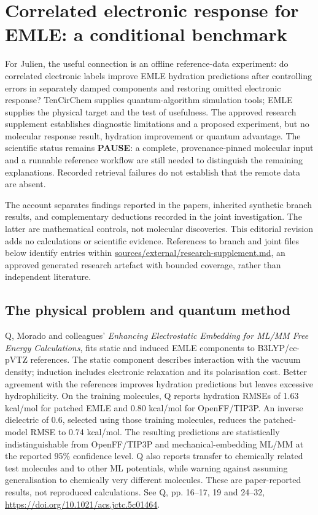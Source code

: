 \documentclass{article}
\date{}
\begin{document}
\section{Correlated electronic response for EMLE: a conditional benchmark}

For Julien, the useful connection is an offline reference-data experiment: do correlated electronic labels improve EMLE hydration predictions after controlling errors in separately damped components and restoring omitted electronic response? TenCirChem supplies quantum-algorithm simulation tools; EMLE supplies the physical target and the test of usefulness. The approved research supplement establishes diagnostic limitations and a proposed experiment, but no molecular response result, hydration improvement or quantum advantage. The scientific status remains \textbf{PAUSE}: a complete, provenance-pinned molecular input and a runnable reference workflow are still needed to distinguish the remaining explanations. Recorded retrieval failures do not establish that the remote data are absent.

The account separates findings reported in the papers, inherited synthetic branch results, and complementary deductions recorded in the joint investigation. The latter are mathematical controls, not molecular discoveries. This editorial revision adds no calculations or scientific evidence. References to branch and joint files below identify entries within \url{sources/external/research-supplement.md}, an approved generated research artefact with bounded coverage, rather than independent literature.

\subsection{The physical problem and quantum method}

Q, Morado and colleagues' \emph{Enhancing Electrostatic Embedding for ML/MM Free Energy Calculations}, fits static and induced EMLE components to B3LYP/cc-pVTZ references. The static component describes interaction with the vacuum density; induction includes electronic relaxation and its polarisation cost. Better agreement with the references improves hydration predictions but leaves excessive hydrophilicity. On the training molecules, Q reports hydration RMSEs of 1.63 kcal/mol for patched EMLE and 0.80 kcal/mol for OpenFF/TIP3P. An inverse dielectric of 0.6, selected using those training molecules, reduces the patched-model RMSE to 0.74 kcal/mol. The resulting predictions are statistically indistinguishable from OpenFF/TIP3P and mechanical-embedding ML/MM at the reported 95\% confidence level. Q also reports transfer to chemically related test molecules and to other ML potentials, while warning against assuming generalisation to chemically very different molecules. These are paper-reported results, not reproduced calculations. See Q, pp. 16--17, 19 and 24--32, \url{https://doi.org/10.1021/acs.jctc.5c01464}.
\end{document}
